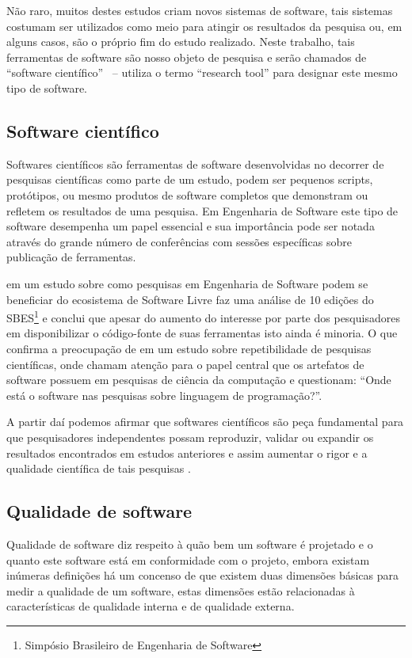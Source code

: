 \documentclass[qual, classic, a4paper]{ufbathesis}
\begin{document}
Não raro, muitos destes estudos criam novos sistemas de software, tais
sistemas costumam ser utilizados como meio para atingir os resultados da
pesquisa ou, em alguns casos, são o próprio fim do estudo realizado. Neste
trabalho, tais ferramentas de software são nosso objeto de pesquisa e serão
chamados de ``software científico'' \ --  utiliza o termo
``research tool'' para designar este mesmo tipo de software.

\subsection{Software científico}

Softwares científicos são ferramentas de software desenvolvidas no decorrer de
pesquisas científicas como parte de um estudo, podem ser pequenos scripts,
protótipos, ou mesmo produtos de software completos que demonstram ou refletem
os resultados de uma pesquisa. Em Engenharia de Software este tipo de software
desempenha um papel essencial e sua importância pode ser notada através do
grande número de conferências com sessões específicas sobre publicação de
ferramentas.

 em um estudo sobre como pesquisas em Engenharia de
Software podem se beneficiar do ecosistema de Software Livre faz uma análise
de 10 edições do SBES\footnote{Simpósio Brasileiro de Engenharia de Software}
e conclui que apesar do aumento do interesse por parte dos pesquisadores em
disponibilizar o código-fonte de suas ferramentas isto ainda é minoria. O
que confirma a preocupação de  em um estudo
sobre repetibilidade de pesquisas científicas, onde chamam atenção para o papel
central que os artefatos de software possuem em pesquisas de ciência da
computação e questionam: ``Onde está o software nas pesquisas sobre linguagem
de programação?''.

A partir daí podemos afirmar que softwares científicos são peça fundamental
para que pesquisadores independentes possam reproduzir, validar ou expandir os
resultados encontrados em estudos anteriores e assim aumentar o rigor e a
qualidade científica de tais pesquisas \cite{Vitek2011}.

\subsection{Qualidade de software}

Qualidade de software diz respeito à quão bem um software é projetado e o
quanto este software está em conformidade com o projeto, embora existam
inúmeras definições há um concenso de que existem duas dimensões básicas para medir a
qualidade de um software, estas dimensões estão relacionadas à características
de qualidade interna e de qualidade externa.
\end{document}
